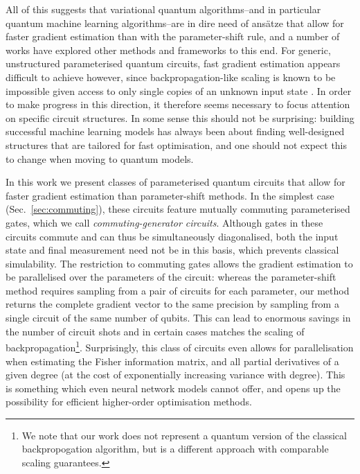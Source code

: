 \documentclass[a4paper,twocolumn,11pt,accepted=2025-09-06]{quantumarticle}
\begin{document}
All of this suggests that variational quantum algorithms--and in particular quantum machine learning algorithms--are in dire need of ans\"atze that allow for faster gradient estimation than with the parameter-shift rule, and a number of works have explored other methods \cite{anastasiou2023really,basheer2022alternating,kasture2022protocols,frugal1,frugal2,frugal3,frugal4,ding2024random} and frameworks \cite{verdon2018universal} to this end. For generic, unstructured parameterised quantum circuits, fast gradient estimation appears difficult to achieve however, since backpropagation-like scaling is known to be impossible given access to only single copies of an unknown input state \cite{abbas2023quantum}. In order to make progress in this direction, it therefore seems necessary to focus attention on specific circuit structures. In some sense this should not be surprising: building successful machine learning models has always been about finding well-designed structures that are tailored for fast optimisation, and one should not expect this to change when moving to quantum models.   

In this work we present classes of parameterised quantum circuits that allow for faster gradient estimation than parameter-shift methods. In the simplest case (Sec.\ \ref{sec:commuting}), these circuits feature mutually commuting parameterised gates, which we call \emph{commuting-generator circuits}. Although gates in these circuits commute and can thus be simultaneously diagonalised, both the input state and final measurement need not be in this basis, which prevents classical simulability. The restriction to commuting gates allows the gradient estimation to be parallelised over the parameters of the circuit: whereas the parameter-shift method requires sampling from a pair of circuits for each parameter, our method returns the complete gradient vector to the same precision by sampling from a single circuit of the same number of qubits. This can lead to enormous savings in the number of circuit shots and in certain cases matches the scaling of backpropagation\footnote{We note that our work does not represent a quantum version of the classical backpropogation algorithm, but is a different approach with comparable scaling guarantees.}. Surprisingly, this class of circuits even allows for parallelisation when estimating the Fisher information matrix, and all partial derivatives of a given degree (at the cost of exponentially increasing variance with degree). This is something which even neural network models cannot offer, and opens up the possibility for efficient higher-order optimisation methods. 
\end{document}
